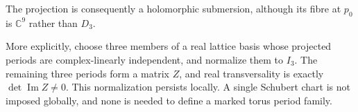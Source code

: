 The projection is consequently a holomorphic submersion,
although its fibre at $p_0$ is $\mathbb C^9$ rather than $D_3$.


More explicitly, choose three members of a real lattice basis
whose projected periods are complex-linearly independent, and
normalize them to $I_3$.  The remaining three periods form a
matrix $Z$, and real transversality is exactly
$\det\operatorname{Im}Z\ne0$.  This normalization persists
locally.  A single Schubert chart is not imposed globally,
and none is needed to define a marked torus period family.

